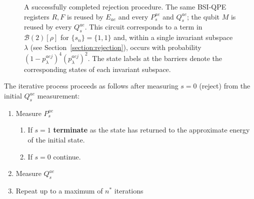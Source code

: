 \documentclass[aps,floatfix,10pt,amssymb,amsfont,amsmath,superscriptaddress,float,nofootinbib,longbibliography,nobalancelastpage,twocolumn]{revtex4-2}
\begin{document}
\begin{figure}
\caption{A successfully completed rejection procedure. The same BSI-QPE registers $R, F$ is reused by $E_{ae}$ and every $P_s^{ae}$ and $Q_s^{ae}$; the qubit $M$ is reused by every $Q_s^{ae}$. This circuit corresponds to a term in $\mathcal{B}(2)[\rho]$ for $\{s_n\}=\{1,1\}$ and, within a single invariant subspace $\lambda$ (see Section~\ref{section:rejection}), occurs with probability $(1-p^{aej}_{\lambda})^4(p^{aej}_{\lambda})^2$. The state labels at the barriers denote the corresponding states of each invariant subspace.}
\label{fig:fullcircuit}
\end{figure}

The iterative process proceeds as follows after measuring $s=0$ (reject) from the initial $Q_s^{ae}$ measurement: 
\begin{enumerate}
    \item Measure $P_s^{ae}$
        \begin{enumerate}
            \item If $s=1$ \textbf{terminate} as the state has returned to the approximate energy of the initial state.
            \item If $s=0$ continue.
        \end{enumerate}
    \item Measure $Q_s^{ae}$
    \item Repeat up to a maximum of $n^*$ iterations
\end{enumerate}
\end{document}
